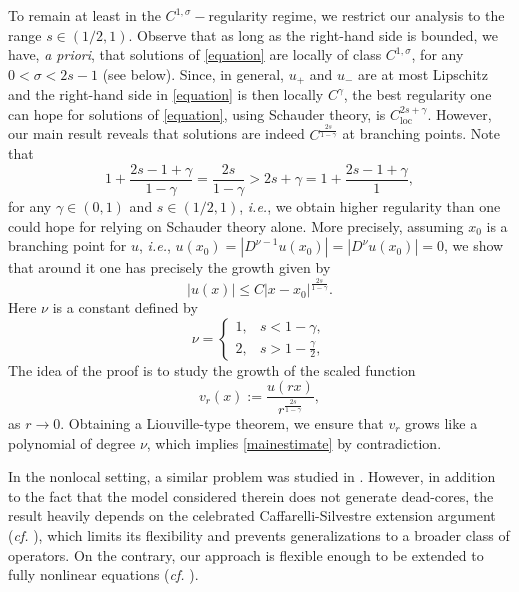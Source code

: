\documentclass[11pt,reqno]{amsart}
\numberwithin{equation}{section}
\numberwithin{theorem}{section}
\numberwithin{lemma}{section}
\numberwithin{corollary}{section}
\numberwithin{remark}{section}
\numberwithin{proposition}{section}
\numberwithin{definition}{section}
\newcommand{\loc}{\operatorname{loc}}
\begin{document}
To remain at least in the $C^{1,\sigma}-$regularity regime, we restrict our analysis to the range $s\in\left(1/2,1\right)$. Observe that as long as the right-hand side is bounded, we have, \textit{a priori}, that solutions of \eqref{equation} are locally of class $C^{1,\sigma}$, for any $0<\sigma<2s-1$ (see  below). Since, in general, $u_+$ and $u_-$ are at most Lipschitz and the right-hand side in \eqref{equation} is then locally $C^\gamma$, the best regularity one can hope for solutions of \eqref{equation}, using Schauder theory, is $C^{2s+\gamma}_{\loc}$. However, our main result reveals that solutions are indeed $C^{\frac{2s}{1-\gamma}}$ at branching points. Note that
$$
1+\frac{2s-1+\gamma}{1-\gamma} = \boxed{\frac{2s}{1-\gamma}>2s+\gamma} = 1+\frac{2s-1+\gamma}{1},
$$
for any $\gamma \in (0,1)$ and $s\in \left(1/2,1\right)$, \textit{i.e.}, we obtain higher regularity than one could hope for relying on Schauder theory alone. More precisely, assuming $x_0$ is a branching point for $u$, \textit{i.e.}, $u(x_0)=|D^{\nu-1}u(x_0)|=|D^\nu u(x_0)|=0$, we show that around it one has precisely the growth given by
\begin{equation}\label{mainestimate}
|u(x)|\leq C|x-x_0|^{\frac{2s}{1-\gamma}}.
\end{equation}
Here $\nu$ is a constant defined by
\begin{equation*}
    \nu=\left\{\begin{array}{cc}
    1, &  s<1-\gamma,\\
    2, &  s>1-\frac{\gamma}{2},
    \end{array}
    \right.
\end{equation*}
The idea of the proof is to study the growth of the scaled function
$$
v_r(x):=\frac{u(rx)}{r^{\frac{2s}{1-\gamma}}},
$$
as $r\rightarrow 0$. Obtaining a Liouville-type theorem, we ensure that $v_r$ grows like a polynomial of degree $\nu$, which implies \eqref{mainestimate} by contradiction. 

In the nonlocal setting, a similar problem was studied in \cite{Y13}. However, in addition to the fact that the model considered therein does not generate dead-cores, the result heavily depends on the celebrated Caffarelli-Silvestre extension argument (\textit{cf.} \cite{CS07}), which limits its flexibility and prevents generalizations to a broader class of operators. On the contrary, our approach is flexible enough to be extended to fully nonlinear equations (\textit{cf.} ).

\smallskip
\end{document}
